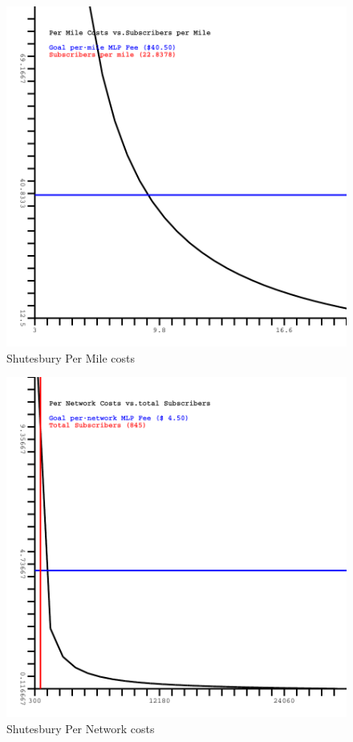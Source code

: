 \documentclass[12pt]{article}
\begin{document}
\begin{figure}[Hptb]
\begin{centering}
\includegraphics[width=5in]{SHUTESBURY-PerMile.pdf}
\caption{Shutesbury Per Mile costs}
\label{fig:SHUTESBURYPM}
\end{centering}
\end{figure}
\begin{figure}[Hpbt]
\begin{centering}
\includegraphics[width=5in]{SHUTESBURY-PerNetwork.pdf}
\caption{Shutesbury Per Network costs}
\label{fig:SHUTESBURYPN}
\end{centering}
\end{figure}
\end{document}
